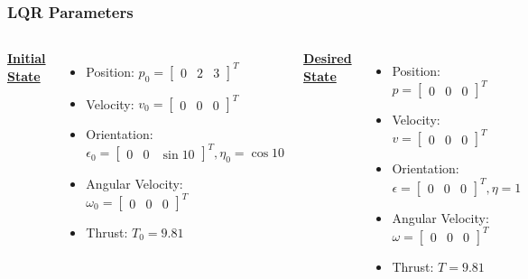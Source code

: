 \documentclass{beamer}
\begin{document}

\begin{frame}
    \frametitle{LQR Parameters}

    \begin{columns}
        \begin{center}
            \uline{\bfseries {Initial State}}
        \end{center}
        \begin{itemize}
            \item Position: $p_{0}=\left[\begin{array}{lll}0 & 2 & 3\end{array}\right]^{T}$
            \item Velocity: $v_{0}=\left[\begin{array}{lll}0 & 0 & 0\end{array}\right]^{T}$
            \item Orientation: $\epsilon_{0}=\left[\begin{array}{lll}0 & 0 & \sin 10\end{array}\right]^{T}, \eta_{0}=\cos 10$
            \item Angular Velocity: $\omega_{0}=\left[\begin{array}{lll}0 & 0 & 0\end{array}\right]^{T}$
            \item Thrust: $T_{0}=9.81$
        \end{itemize}
        \begin{center}
            \uline{\bfseries {Desired State}}
        \end{center}
        \begin{itemize}
            \item Position: $p=\left[\begin{array}{lll}0 & 0 & 0\end{array}\right]^{T}$
            \item Velocity: $v=\left[\begin{array}{lll}0 & 0 & 0\end{array}\right]^{T}$
            \item Orientation: $\epsilon=\left[\begin{array}{lll}0 & 0 & 0\end{array}\right]^{T}, \eta=1 $
            \item Angular Velocity: $\omega=\left[\begin{array}{lll}0 & 0 & 0\end{array}\right]^{T}$
            \item Thrust: $T=9.81$
        \end{itemize}
    \end{columns}
\end{frame}
\end{document}
